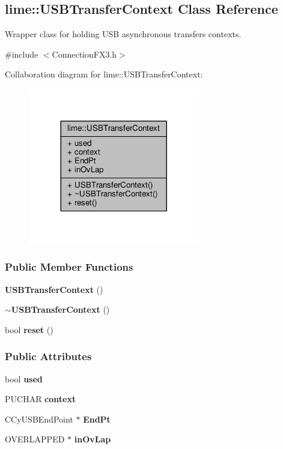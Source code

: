 \subsection{lime\+:\+:U\+S\+B\+Transfer\+Context Class Reference}
\label{classlime_1_1USBTransferContext}


Wrapper class for holding U\+SB asynchronous transfers contexts.  




{\ttfamily \#include $<$Connection\+F\+X3.\+h$>$}



Collaboration diagram for lime\+:\+:U\+S\+B\+Transfer\+Context\+:
\nopagebreak
\begin{figure}[H]
\begin{center}
\leavevmode
\includegraphics[width=212pt]{de/d1e/classlime_1_1USBTransferContext__coll__graph}
\end{center}
\end{figure}
\subsubsection*{Public Member Functions}
\begin{DoxyCompactItemize}
\item 
{\bf U\+S\+B\+Transfer\+Context} ()
\item 
{\bf $\sim$\+U\+S\+B\+Transfer\+Context} ()
\item 
bool {\bf reset} ()
\end{DoxyCompactItemize}
\subsubsection*{Public Attributes}
\begin{DoxyCompactItemize}
\item 
bool {\bf used}
\item 
P\+U\+C\+H\+AR {\bf context}
\item 
C\+Cy\+U\+S\+B\+End\+Point $\ast$ {\bf End\+Pt}
\item 
O\+V\+E\+R\+L\+A\+P\+P\+ED $\ast$ {\bf in\+Ov\+Lap}
\end{DoxyCompactItemize}


